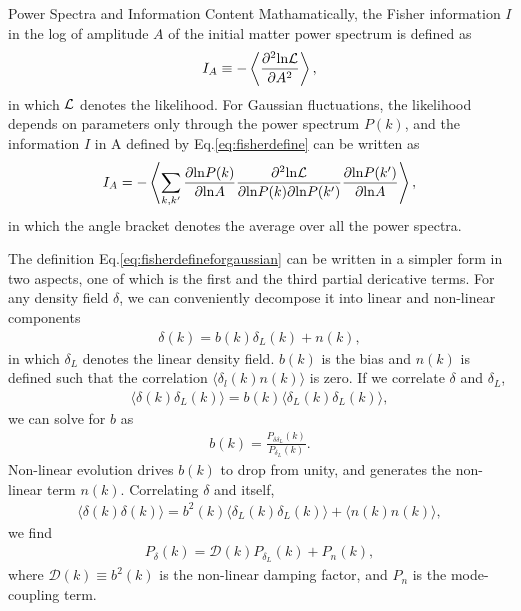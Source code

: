 \begin{section}{Power Spectra and Information Content}
   Mathamatically, the Fisher information \cite{bib:Tegmark1997} $I$ in the log of amplitude $A$ of the initial 
matter power spectrum is defined as 
\begin{align}
   I_A \equiv -\left\langle \frac{\partial ^2 \mathrm{ln \mathcal{L}}}{\partial A ^2}\right\rangle,
\label{eq:fisherdefine}
\end{align}
   in which $\mathcal{L}$ denotes the likelihood. For Gaussian fluctuations, the likelihood depends on
parameters only through the power spectrum $P(k)$, and the information $I$ in A defined by Eq.\ref{eq:fisherdefine}
can be written as \cite{bib:Rimes2006}
\begin{align}
    I_A = - \left\langle \sum_{k,k'} \frac{\partial \mathrm{ln} P(k)}{\partial \mathrm{ln} A} 
\frac{\partial ^2 \mathrm{ln \mathcal{L}}}{\partial \mathrm{ln} P(k) \partial \mathrm{ln} P(k')}
\frac{\partial \mathrm{ln} P(k')}{\partial \mathrm{ln} A}\right\rangle,
\label{eq:fisherdefineforgaussian}
\end{align}
in which the angle bracket denotes the average over all the power spectra.

  The definition Eq.\ref{eq:fisherdefineforgaussian} can be written in a simpler form in two aspects, one 
of which is the first and the third partial dericative terms. 
For any density field $\delta$, we can conveniently decompose it into linear and non-linear components
\begin{align}
    \delta (k) = b (k) \delta _L (k) + n (k),
\label{eq:decompose}
\end{align}
in which $\delta_L$ denotes the linear density field. $b (k)$ is the bias and $n (k)$ is defined  
such that the correlation $\langle \delta_l (k) n (k) \rangle$ is zero. If we correlate  
$\delta$ and $\delta_L$,
\begin{align}
   \langle \delta (k) \delta_L (k) \rangle = b (k) \langle \delta_L (k) \delta_L (k) \rangle,
\label{eq:correlating}
\end{align} 
    we can solve for $b$ as 
\begin{align}
    b (k) = \frac{P _{\delta \delta_L}(k)}{P_{\delta_L}(k)}.
\label{eq:bofk}
\end{align}
Non-linear evolution drives $b (k)$ to drop from unity, and generates the non-linear term $n (k)$. 
Correlating $\delta$ and itself, 
\begin{align}
  \langle \delta (k) \delta (k) \rangle = b^2 (k) \langle \delta_L (k) \delta_L (k) \rangle + \langle n(k)n(k) \rangle,
\end{align}
we find 
\begin{align}
   P_\delta (k) = \mathcal{D} (k) P_{\delta_L} (k) + P_n (k),
\label{eq:powerdecompose}
\end{align}
where $\mathcal{D}(k) \equiv b^2 (k)$ is the non-linear damping factor, and $P_n$ is the mode-coupling term.


\end{section}

